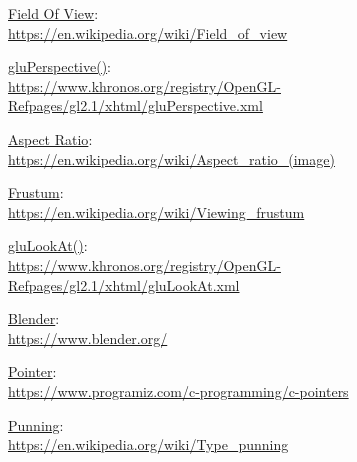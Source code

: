 \documentclass[12pt]{article}
\begin{document}
\begin{thebibliography}{9}

\underline{Field Of View}:\\
\url{https://en.wikipedia.org/wiki/Field_of_view}

\underline{gluPerspective()}:\\
\url{https://www.khronos.org/registry/OpenGL-Refpages/gl2.1/xhtml/gluPerspective.xml}

\underline{Aspect Ratio}:\\
\url{https://en.wikipedia.org/wiki/Aspect_ratio_(image)}

\underline{Frustum}:\\
\url{https://en.wikipedia.org/wiki/Viewing_frustum}

\underline{gluLookAt()}:\\
\url{https://www.khronos.org/registry/OpenGL-Refpages/gl2.1/xhtml/gluLookAt.xml}

\underline{Blender}:\\
\url{https://www.blender.org/}

\underline{Pointer}:\\
\url{https://www.programiz.com/c-programming/c-pointers}

\underline{Punning}:\\
\url{https://en.wikipedia.org/wiki/Type_punning}







\end{thebibliography}
\end{document}
